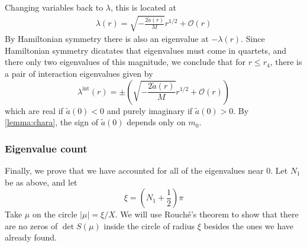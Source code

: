\documentclass[thesis.tex]{subfiles}
\begin{document}
Changing variables back to $\lambda$, this is located at
\begin{align*}
\lambda(r) = \sqrt{-\frac{2 \tilde{a}(r)}{M}}r^{1/2} + \mathcal{O}\left( r \right)
\end{align*}
By Hamiltonian symmetry there is also an eigenvalue at $-\lambda(r)$. Since Hamiltonian symmetry  dicatates that eigenvalues must come in quartets, and there only two eigenvalues of this magnitude, we conclude that for $r \leq r_4$, there is a pair of interaction eigenvalues given by
\[
\lambda^{\text{int}}(r) = \pm \left( \sqrt{ -\frac{2 \tilde{a}(r)}{M} }r^{1/2} + \mathcal{O}\left( r \right) \right)
\]
which are real if $\tilde{a}(0) < 0$ and purely imaginary if $\tilde{a}(0) > 0$. By \cref{lemma:chara}, the sign of $\tilde{a}(0)$ depends only on $m_0$.

\subsubsection{Eigenvalue count}

Finally, we prove that we have accounted for all of the eigenvalues near 0. Let $N_1$ be as above, and let
\[
\xi = \left( N_1 + \frac{1}{2} \right)\pi
\]
Take $\mu$ on the circle $|\mu| = \xi/X$. We will use Rouch\'{e}'s theorem to show that there are no zeros of $\det S(\mu)$ inside the circle of radius $\xi$ besides the ones we have already found.
\end{document}
